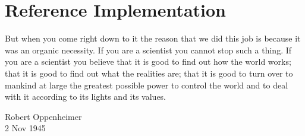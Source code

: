 \part{Reference Implementation}

\epigraph{
  But when you come right down to it the reason that we did this job is because
  it was an organic necessity. If you are a scientist you cannot stop such a thing.
  If you are a scientist you believe that it is good to find out how the world works;
  that it is good to find out what the realities are; that it is good to turn over
  to mankind at large the greatest possible power to control the world and to deal
  with it according to its lights and its values. 
}{Robert Oppenheimer\\2 Nov 1945}



